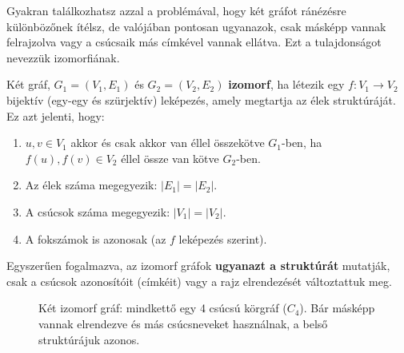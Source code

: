 \documentclass[a4paper,12pt]{article}
\newcommand{\textbfr}[1]{\textbf{\textcolor{bvred}{#1}}} %
\theoremstyle{definition} %
\begin{document}
Gyakran találkozhatsz azzal a problémával, hogy két gráfot ránézésre különbözőnek ítélsz, de valójában pontosan ugyanazok, csak másképp vannak felrajzolva vagy a csúcsaik más címkével vannak ellátva. Ezt a tulajdonságot nevezzük izomorfiának.

\begin{definiciodoboz}
Két gráf, $G_1 = (V_1, E_1)$ és $G_2 = (V_2, E_2)$ \textbf{izomorf}, ha létezik egy $f: V_1 \to V_2$ bijektív (egy-egy és szürjektív) leképezés, amely megtartja az élek struktúráját. Ez azt jelenti, hogy:
\begin{enumerate}
    \item $u,v \in V_1$ akkor és csak akkor van éllel összekötve $G_1$-ben, ha $f(u), f(v) \in V_2$ éllel össze van kötve $G_2$-ben.
    \item Az élek száma megegyezik: $|E_1| = |E_2|$.
    \item A csúcsok száma megegyezik: $|V_1| = |V_2|$.
    \item A fokszámok is azonosak (az $f$ leképezés szerint).
\end{enumerate}
Egyszerűen fogalmazva, az izomorf gráfok \textbfr{ugyanazt a struktúrát} mutatják, csak a csúcsok azonosítóit (címkéit) vagy a rajz elrendezését változtattuk meg.
\end{definiciodoboz}

\begin{figure}[H]
    \centering
    \caption{Két izomorf gráf: mindkettő egy 4 csúcsú körgráf ($C_4$). Bár másképp vannak elrendezve és más csúcsneveket használnak, a belső struktúrájuk azonos.}
    \label{fig:isomorphic_graphs}
\end{figure}
\end{document}
